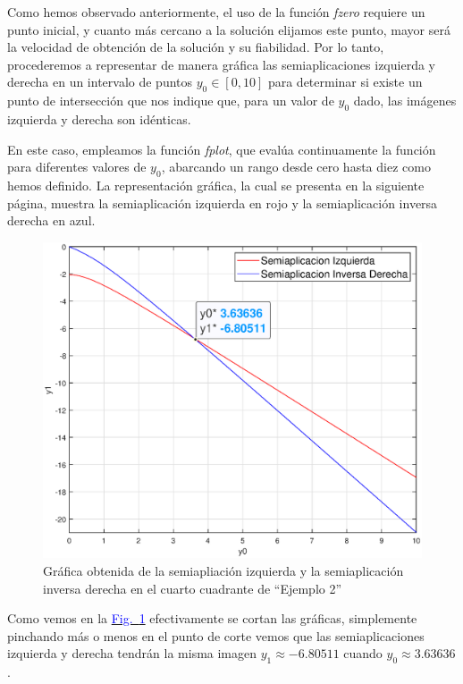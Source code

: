 \documentclass[12pt,a4paper]{report} %
\newcommand{\fref}[1]{\hyperref[#1]{\textcolor{blue}{Fig.~\ref*{#1}}}}
\newcommand{\fref}[1]{\hyperref[#1]{\textcolor{blue}{\textit{Fig.~\ref*{#1}}}}}
\begin{document}
	Como hemos observado anteriormente, el uso de la función \textit{fzero} requiere un punto inicial, y cuanto más cercano a la solución elijamos este punto, mayor será la velocidad de obtención de la solución y su fiabilidad. Por lo tanto, procederemos a representar de manera gráfica las semiaplicaciones izquierda y derecha en un intervalo de puntos $y_0 \in [0, 10]$ para determinar si existe un punto de intersección que nos indique que, para un valor de $y_0$ dado, las imágenes izquierda y derecha son idénticas.
	
	\vspace{1cm}
	
	\vspace{1cm}En este caso, empleamos la función \textit{fplot}, que evalúa continuamente la función para diferentes valores de $y_0$, abarcando un rango desde cero hasta diez como hemos definido. La representación gráfica, la cual se presenta en la siguiente página, muestra la semiaplicación izquierda en rojo y la semiaplicación inversa derecha en azul.
	\newpage
	
	\begin{figure}[h]
		\centering
		\includegraphics[width=1\textwidth]{g1ejem2.eps}
		\caption{Gráfica obtenida de la semiapliación izquierda y la semiaplicación inversa derecha en el cuarto cuadrante de ``Ejemplo 2''}
		\label{fig:ejem2_2}
	\end{figure}\smallskip
	
	Como vemos en la \fref{fig:ejem2_2} efectivamente se cortan las gráficas, simplemente pinchando más o menos en el punto de corte vemos que las semiaplicaciones izquierda y derecha tendrán la misma imagen $y_1\approx-6.80511$ cuando $y_0\approx3.63636$.
	\newpage
	
\end{document}
